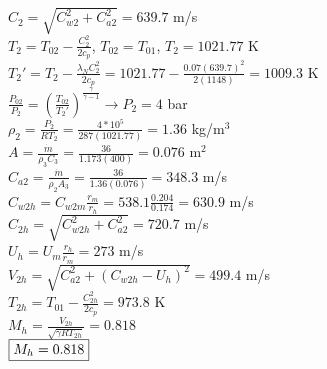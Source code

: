 \documentclass{article}
\begin{document}
$C_2=\sqrt{C_{w2}^2+C_{a2}^2}=639.7$ m/s \\
$T_2=T_{02}-\frac{C_2^2}{2c_p}$, \quad $T_{02}=T_{01}$, \quad $T_2=1021.77$ K \\
$T_2'=T_2-\frac{\lambda_N C_2^2}{2c_p}=1021.77-\frac{0.07(639.7)^2}{2(1148)}=1009.3$ K \\
$\frac{P_{02}}{P_2}=(\frac{T_{02}}{T_2'})^\frac{\gamma}{\gamma-1} \rightarrow P_2=4$ bar \\
$\rho_2=\frac{P_2}{RT_2}=\frac{4*10^5}{287(1021.77)}=1.36$ kg/m$^3$ \\
$A=\frac{\dot{m}}{\rho_3 C_3}=\frac{36}{1.173(400)}=0.076$ m$^2$ \\
$C_{a2}=\frac{\dot{m}}{\rho_2 A_3}=\frac{36}{1.36(0.076)}=348.3$ m/s \\
$C_{w2h}=C_{w2m}\frac{r_m}{r_h}=538.1\frac{0.204}{0.174}=630.9$ m/s \\
$C_{2h}=\sqrt{C_{w2h}^2+C_{a2}^2}=720.7$ m/s \\
$U_h=U_m\frac{r_h}{r_m}=273$ m/s \\
$V_{2h}=\sqrt{C_{a2}^2+(C_{w2h}-U_h)^2}=499.4$ m/s \\
$T_{2h}=T_{01}-\frac{C_{2h}^2}{2c_p}=973.8$ K \\
$M_h=\frac{V_{2h}}{\sqrt{\gamma RT_{2h}}}=0.818$ \\
$\fbox{$M_h=0.818$}$
\end{document}
